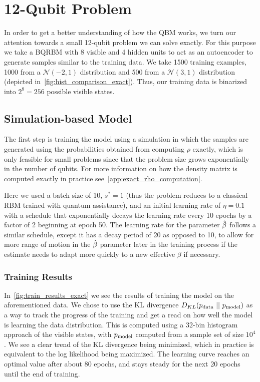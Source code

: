 \section{12-Qubit Problem}
In order to get a better understanding of how the QBM works, we turn our attention towards a small 12-qubit problem we can solve exactly.
For this purpose we take a BQRBM with 8 visible and 4 hidden units to act as an autoencoder to generate samples similar to the training data.
We take 1500 training examples, 1000 from a \( \mathcal{N}(-2, 1) \) distribution and 500 from a \( \mathcal{N}(3, 1) \) distribution (depicted in~\cref{fig:hist_comparison_exact}).
Thus, our training data is binarized into \( 2^8 = 256 \) possible visible states.

\subsection{Simulation-based Model}
The first step is training the model using a simulation in which the samples are generated using the probabilities obtained from computing \( \rho \) exactly, which is only feasible for small problems since that the problem size grows exponentially in the number of qubits.
For more information on how the density matrix is computed exactly in practice see~\cref{app:exact_rho_computation}.

Here we used a batch size of 10, \( s^* = 1 \) (thus the problem reduces to a classical RBM trained with quantum assistance), and an initial learning rate of \( \eta = 0.1 \) with a schedule that exponentially decays the learning rate every 10 epochs by a factor of 2 beginning at epoch 50.
The learning rate for the parameter \( \hat{\beta} \) follows a similar schedule, except it has a decay period of 20 as opposed to 10, to allow for more range of motion in the \( \hat{\beta} \) parameter later in the training process if the estimate needs to adapt more quickly to a new effective \( \beta \) if necessary.

\subsubsection{Training Results}
In~\cref{fig:train_results_exact} we see the results of training the model on the aforementioned data.
We chose to use the KL divergence \( D_{KL}(p_{\text{data}} \ || \ p_{\text{model}}) \) as a way to track the progress of the training and get a read on how well the model is learning the data distribution.
This is computed using a 32-bin histogram approach of the visible states, with \( p_{\text{model}} \) computed from a sample set of size \( 10^4 \).
We see a clear trend of the KL divergence being minimized, which in practice is equivalent to the log likelihood being maximized.
The learning curve reaches an optimal value after about 80 epochs, and stays steady for the next 20 epochs until the end of training.

